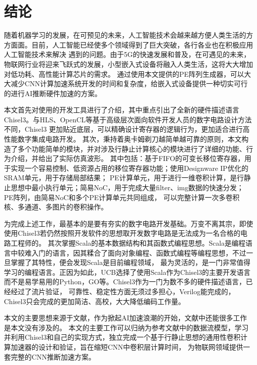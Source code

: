 \chapter{结论}
随着机器学习的发展，在可预见的未来，人工智能技术会越来越方便人类生活的方方面面。目前，人工智能已经使多个领域得到了巨大突破，各行各业也在积极应用人工智能技术来解决
遇到的问题。由于5G的快速发展和普及，在可遇见的未来，物联网行业将迎来飞跃式的发展，小型嵌入式设备将融入人类生活，这将大大增加对低功耗、高性能计算芯片的需求。
通过使用本文提供的PE阵列生成器，可以大大减少CNN计算加速系统开发的时间和复杂度，给嵌入式设备提供一种切实可行的进行AI推断硬件加速的方案。

本文首先对使用的开发工具进行了介绍，其中重点引出了全新的硬件描述语言Chisel3。与HLS、OpenCL等基于高级层次面向软件开发人员的数字电路设计方法不同，Chisel3
更加贴近底层，可以精确设计寄存器的逻辑行为，更加适合进行高性能数字集成电路开发。
其次，秉持着奥卡姆剃刀越简单越可靠的原则，本文构造了多个功能简单的模块，并对涉及行静止计算核心的模块进行了详细的功能、行为介绍，并给出了实际仿真波形。
其中包括：基于FIFO的可变长移位寄存器，用于实现一个容易控制、低资源占用的移位寄存器功能；使用Designware IP优化的SRAM单元，用于存储局部结果；
PE计算单元，用于进行一维卷积计算，是行静止思想中最小执行单元；简易NoC，用于完成大量filter、img数据的快速分发；PE阵列，由简易NoC和多个PE计算单元共同组成，
可以完整计算一次多卷积核、多通道、多图片的卷积操作。

为完成上述工作，最基本的是要有夯实的数字电路开发基础。万变不离其宗，即使使用Chisel3若仍然按照开发软件的思想取开发数字电路是无法成为一名合格的电路工程师的。
其次掌握Scala的基本数据结构和其函数式编程思想。Scala是编程语言中较难入门的语言，因其糅合了面向对象编程、函数式编程等编程思想，不过一旦掌握了其特性，便会发现Scala是目前编程领域，
最为灵活的，是一门非常值得学习的编程语言。正因为如此，UCB选择了使用Scala作为Chisel3的主要开发语言而不是易学易用的Python，GO等。Chisel3作为一门为数不多的硬件描述语言，已经经过了流片验证，
可靠性、稳定性方面无须过多担心，Verilog能完成的，Chisel3只会完成的更加简洁、高校，大大降低编码工作量。

本文的主要思想来源于文献\cite{chen2016eyeriss}，作为掀起AI加速浪潮的开始，文献\cite{chen2016eyeriss}中还能很多工作是本文没有涉及的。
本文的主要工作可以归纳为参考文献\cite{chen2016eyeriss}中的数据流模型，学习并利用Chisel3和自己的实现方式，独立完成一个基于行静止思想的通用性卷积计算加速器的设计和验证，旨在缩短CNN中卷积层计算时间，
为物联网领域提供一套完整的CNN推断加速方案。

